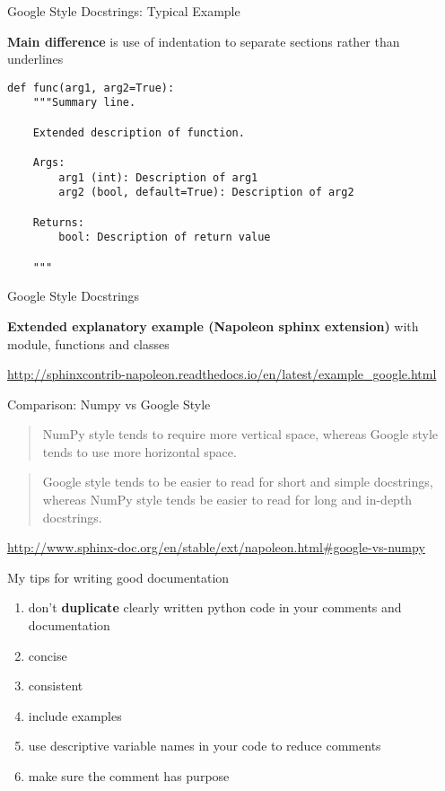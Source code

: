 \documentclass{beamer}
\begin{document}
\begin{frame}[fragile]{Google Style Docstrings: Typical Example}

\textbf{Main difference} is use of indentation to separate sections rather than underlines

\begin{verbatim}
def func(arg1, arg2=True):
    """Summary line.

    Extended description of function.

    Args:
        arg1 (int): Description of arg1
        arg2 (bool, default=True): Description of arg2

    Returns:
        bool: Description of return value

    """
\end{verbatim}
\end{frame}


\begin{frame}{Google Style Docstrings}

\textbf{Extended explanatory example (Napoleon sphinx extension)} with module, functions and classes

\url{http://sphinxcontrib-napoleon.readthedocs.io/en/latest/example_google.html}

\end{frame}


\begin{frame}{Comparison: Numpy vs Google Style}

\begin{quote}
NumPy style tends to require more vertical space, whereas Google style tends to use more horizontal space. 
\end{quote}

\begin{quote}
Google style tends to be easier to read for short and simple docstrings, whereas NumPy style tends be easier to read for long and in-depth docstrings.
\end{quote}

\begin{flushright}
\url{http://www.sphinx-doc.org/en/stable/ext/napoleon.html\#google-vs-numpy}
\end{flushright}

\end{frame}


\begin{frame}{My tips for writing good documentation}

\begin{enumerate}
  \item don't \textbf{duplicate} clearly written python code in your comments and documentation
  \item concise
  \item consistent
  \item include examples
  \item use descriptive variable names in your code to reduce comments
  \item make sure the comment has purpose
\end{enumerate}

\end{frame}
\end{document}
